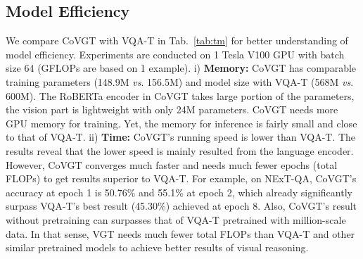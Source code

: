 \documentclass[10pt,journal,compsoc]{IEEEtran}
\newcommand{\vs}{\textit{vs}. }
\begin{document}
\subsection{Model Efficiency}
\setlength{\tabcolsep}{5pt}
\begin{table}[t!]
    \small
    \centering
    \caption{Comparison of memory and time based on NExT-QA \cite{xiao2021next}. (2m$\times$8: 2 minutes per epoch and 8 epochs in total.) 
    }
    \vspace{-0.5em}
    \label{tab:tm}
    \vspace{-0.4cm}
\end{table}



We compare CoVGT with VQA-T in Tab.~\ref{tab:tm} for better understanding of model efficiency. Experiments are conducted on 1 Tesla V100 GPU with batch size 64 (GFLOPs are based on 1 example).
i) \textbf{{Memory:}} CoVGT has comparable training parameters (148.9M \vs 156.5M) and model size with VQA-T (568M \vs 600M). The RoBERTa encoder in CoVGT takes large portion of the parameters, the vision part is lightweight with only 24M parameters. CoVGT needs more GPU memory for training. Yet, the memory for inference is fairly small and close to that of VQA-T. 
ii) \textbf{{Time:}} CoVGT's running speed is lower than VQA-T. The results reveal that the lower speed is mainly resulted from the language encoder. 
However, CoVGT converges much faster and needs much fewer epochs (total FLOPs) to get results superior to VQA-T. For example, on NExT-QA, CoVGT's accuracy at epoch 1 is 50.76\% and 55.1\% at epoch 2, which already significantly surpass VQA-T's best result (45.30\%) achieved at epoch 8. Also, CoVGT's result without pretraining can surpasses that of VQA-T pretrained with million-scale data. In that sense, VGT needs much fewer total FLOPs than VQA-T and other similar pretrained models to achieve better results of visual reasoning. 
\end{document}
